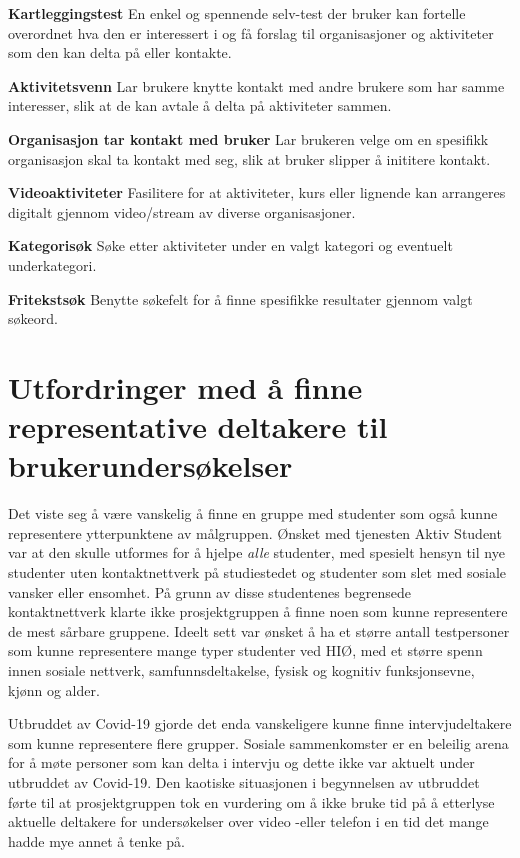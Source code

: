 \begin{compactitem}
\item[{\bf Kartleggingstest}] En enkel og spennende selv-test der bruker kan fortelle overordnet hva den er interessert i og få forslag til organisasjoner og aktiviteter som den kan delta på eller kontakte.
\item[{\bf Aktivitetsvenn}] Lar brukere knytte kontakt med andre brukere som har samme interesser, slik at de kan avtale å delta på aktiviteter sammen.
\item[{\bf Organisasjon tar kontakt med bruker}] Lar brukeren velge om en spesifikk organisasjon skal ta kontakt med seg, slik at bruker slipper å inititere kontakt.
\item[{\bf Videoaktiviteter}] Fasilitere for at aktiviteter, kurs eller lignende kan arrangeres digitalt gjennom video/stream av diverse organisasjoner.
\item[{\bf Kategorisøk}] Søke etter aktiviteter under en valgt kategori og eventuelt underkategori.
\item[{\bf Fritekstsøk}] Benytte søkefelt for å finne spesifikke resultater gjennom valgt søkeord.
\end{compactitem}

\section{Utfordringer med å finne representative deltakere til brukerundersøkelser}
Det viste seg å være vanskelig å finne en gruppe med studenter som også kunne representere ytterpunktene av målgruppen. Ønsket med tjenesten Aktiv Student var at den skulle utformes for å hjelpe {\em  alle} studenter, med spesielt hensyn til nye studenter uten kontaktnettverk på studiestedet og studenter som slet med sosiale vansker eller ensomhet. På grunn av disse studentenes begrensede kontaktnettverk klarte ikke prosjektgruppen å finne noen som kunne representere de mest sårbare gruppene. Ideelt sett var ønsket å ha et større antall testpersoner som kunne representere mange typer studenter ved HIØ, med et større spenn innen sosiale nettverk, samfunnsdeltakelse, fysisk og kognitiv funksjonsevne, kjønn og alder.

Utbruddet av Covid-19 gjorde det enda vanskeligere kunne finne intervjudeltakere som kunne representere flere grupper. Sosiale sammenkomster er en beleilig arena for å møte personer som kan delta i intervju og dette ikke var aktuelt under utbruddet av Covid-19. Den kaotiske situasjonen i begynnelsen av utbruddet førte til at prosjektgruppen tok en vurdering om å ikke bruke tid på å etterlyse aktuelle deltakere for undersøkelser over video -eller telefon i en tid det mange hadde mye annet å tenke på. 

